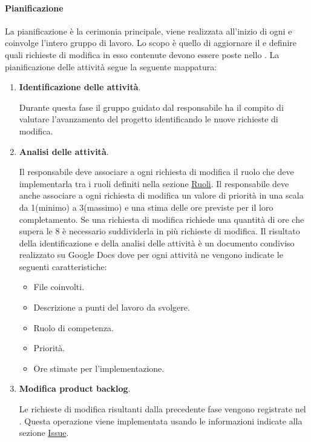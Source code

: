 \paragraph{Pianificazione}
La pianificazione è la cerimonia principale, viene realizzata all’inizio di ogni  e coinvolge l'intero gruppo di lavoro.
Lo scopo è quello di aggiornare il  e definire quali richieste di modifica in esso contenute devono essere poste nello .
La pianificazione delle attività segue la seguente mappatura:
\begin{enumerate}
    \item \textbf{Identificazione delle attività}.
    
    Durante questa fase il gruppo guidato dal responsabile ha il compito di valutare l’avanzamento del progetto identificando le nuove richieste di modifica.

    \item \textbf{Analisi delle attività}.
    
    Il responsabile deve associare a ogni richiesta di modifica il ruolo che deve implementarla tra i ruoli definiti nella sezione \hyperref[subsubsec:ruoli]{Ruoli}.
    Il responsabile deve anche associare a ogni richiesta di modifica un valore di priorità in una scala da 1(minimo) a 3(massimo) e una stima delle ore previste per il loro completamento.
    Se una richiesta di modifica richiede una quantità di ore che supera le 8 è necessario suddividerla in più richieste di modifica.
    Il risultato della identificazione e della analisi delle attività è un documento condiviso realizzato su Google Docs dove per ogni attività ne vengono indicate le seguenti caratteristiche:
    \begin{itemize}
        \item File coinvolti.
        \item Descrizione a punti del lavoro da svolgere.
        \item Ruolo di competenza.
        \item Priorità.
        \item Ore stimate per l'implementazione.
    \end{itemize}

    \item \textbf{Modifica product backlog}.
    
    Le richieste di modifica risultanti dalla precedente fase vengono registrate nel .
    Questa operazione viene implementata usando le informazioni indicate alla sezione \hyperref[subpar:ITS]{Issue}.


\end{enumerate}
